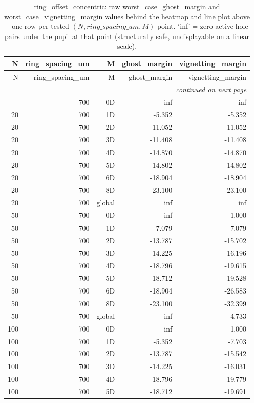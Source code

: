 \begin{longtable}{rrrrr}
\caption{ring\_offset\_concentric: raw worst\_case\_ghost\_margin and worst\_case\_vignetting\_margin values behind the heatmap and line plot above -- one row per tested $(N, ring\_spacing\_um, M)$ point. `inf' = zero active hole pairs under the pupil at that point (structurally safe, undisplayable on a linear scale).} \\
\toprule
N & ring\_spacing\_um & M & ghost\_margin & vignetting\_margin \\
\midrule
\endfirsthead
\toprule
N & ring\_spacing\_um & M & ghost\_margin & vignetting\_margin \\
\midrule
\endhead
\midrule
\multicolumn{5}{r}{\itshape continued on next page} \\
\endfoot
\bottomrule
\endlastfoot
20 & 700 & 0D & inf & inf \\
20 & 700 & 1D & -5.352 & -5.352 \\
20 & 700 & 2D & -11.052 & -11.052 \\
20 & 700 & 3D & -11.408 & -11.408 \\
20 & 700 & 4D & -14.870 & -14.870 \\
20 & 700 & 5D & -14.802 & -14.802 \\
20 & 700 & 6D & -18.904 & -18.904 \\
20 & 700 & 8D & -23.100 & -23.100 \\
20 & 700 & global & inf & inf \\
50 & 700 & 0D & inf & 1.000 \\
50 & 700 & 1D & -7.079 & -7.079 \\
50 & 700 & 2D & -13.787 & -15.702 \\
50 & 700 & 3D & -14.225 & -16.196 \\
50 & 700 & 4D & -18.796 & -19.615 \\
50 & 700 & 5D & -18.712 & -19.528 \\
50 & 700 & 6D & -18.904 & -26.583 \\
50 & 700 & 8D & -23.100 & -32.399 \\
50 & 700 & global & inf & -4.733 \\
100 & 700 & 0D & inf & 1.000 \\
100 & 700 & 1D & -5.352 & -7.703 \\
100 & 700 & 2D & -13.787 & -15.542 \\
100 & 700 & 3D & -14.225 & -16.031 \\
100 & 700 & 4D & -18.796 & -19.779 \\
100 & 700 & 5D & -18.712 & -19.691 \\

\end{longtable}
